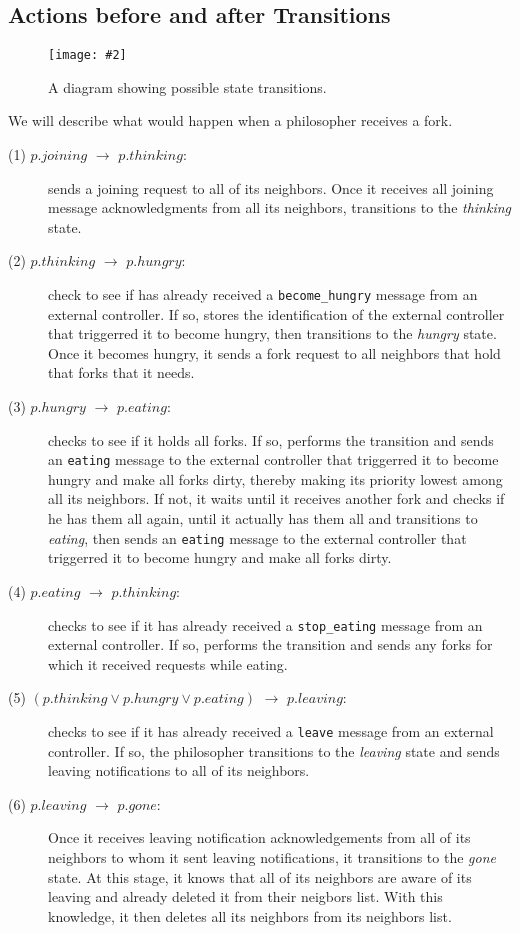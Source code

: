 \documentclass[11pt]{article}
\newcommand{\pic}[2]{\begin{center}\texttt{[image: \#2]}\end{center}}
\begin{document}
\subsection{Actions before and after Transitions}
\begin{figure}[H]
\pic{0.6}{diagram}
\label{fig:diagram}
\caption{A diagram showing possible state transitions.}
\end{figure}

We will describe what would happen when a philosopher receives a fork.


\begin{description}
\item[(1) $p.joining$ $\to$ $p.thinking$:] sends a joining request to all of its neighbors. Once it receives all joining message acknowledgments from all its neighbors, transitions to the \textit{thinking} state.

\item[(2) $p.thinking$ $\to$ $p.hungry$:] check to see if has already received a \texttt{become\_hungry} message from an external controller. If so, stores the identification of the external controller that triggerred it to become hungry, then transitions to the \textit{hungry} state. Once it becomes hungry, it sends a fork request to all neighbors that hold that forks that it needs.

\item[(3) $p.hungry$ $\to$ $p.eating$:] checks to see if it holds all forks. If so, performs the transition and sends an \texttt{eating} message to the external controller that triggerred it to become hungry and make all forks dirty, thereby making its priority lowest among all its neighbors. If not, it waits until it receives another fork and checks if he has them all again, until it actually has them all and transitions to \textit{eating}, then sends an \texttt{eating} message to the external controller that triggerred it to become hungry and make all forks dirty.

\item[(4) $p.eating$ $\to$ $p.thinking$:] checks to see if it has already received a \texttt{stop\_eating} message from an external controller. If so, performs the transition and sends any forks for which it received requests while eating.

\item[(5) $(p.thinking \vee p.hungry \vee p.eating)$ $\to$ $p.leaving$:] checks to see if it has already received a \texttt{leave} message from an external controller. If so, the philosopher transitions to the \textit{leaving} state and sends leaving notifications to all of its neighbors. 

\item[(6) $p.leaving$ $\to$ $p.gone$:]
Once it receives leaving notification acknowledgements from all of its neighbors to whom it sent leaving notifications, it transitions to the \textit{gone} state. At this stage, it knows that all of its neighbors are aware of its leaving and already deleted it from their neigbors list. With this knowledge, it then deletes all its neighbors from its neighbors list.
\end{description}
\end{document}

